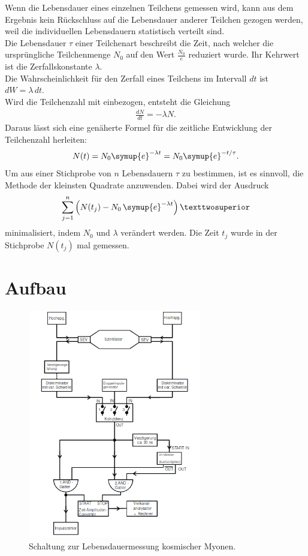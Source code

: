     Wenn die Lebensdauer eines einzelnen Teilchens gemessen wird,
    kann aus dem Ergebnis kein Rückschluss auf die Lebensdauer
    anderer Teilchen gezogen werden, weil die individuellen Lebensdauern
    statistisch verteilt sind. \\
    Die Lebensdauer $\tau$ einer Teilchenart beschreibt die Zeit, nach welcher
    die ursprüngliche Teilchenmenge $N_0$ auf den Wert $\frac{N_0}e$ reduziert
    wurde. Ihr Kehrwert ist die Zerfallskonstante $\lambda.$\\
    Die Wahrscheinlichkeit für den Zerfall eines Teilchens im Intervall $dt$ ist
    $dW=\lambda\,dt.$\\
    Wird die Teilchenzahl mit einbezogen, entsteht die Gleichung
    \begin{align*}
      \frac{dN}{dt}=-\lambda N.
    \end{align*}
    Daraus lässt sich eine genäherte Formel für die zeitliche Entwicklung der
    Teilchenzahl herleiten:
    \begin{align*}
      N(t)=N_0\symup{e}^{-\lambda t}=N_0\symup{e}^{-t/\tau}.
    \end{align*}
    Um aus einer Stichprobe von $n$ Lebensdauern $\tau$ zu bestimmen,
    ist es sinnvoll, die Methode der kleinsten Quadrate anzuwenden.
    Dabei wird der Ausdruck
    \begin{align*}
      \sum_{j=1}^n \left(N(t_j)-N_0\,\symup{e}^{-\lambda t}\right)²
    \end{align*}
    minimalisiert, indem $N_0$ und $\lambda$ verändert werden.
    Die Zeit $t_j$ wurde in der Stichprobe $N(t_j)$ mal gemessen.



  \section{Aufbau}

    \begin{figure}[H]
      \centering
      \includegraphics[height=10cm]{myonaufbau.png}
      \caption{Schaltung zur Lebensdauermessung kosmischer Myonen.}
      \label{fig:schaltung}
    \end{figure}


